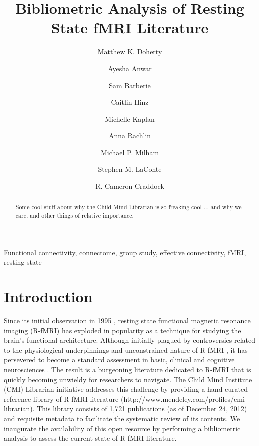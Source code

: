 \documentclass[12pt,3p,review,number]{elsarticle}
\begin{document}
\title{Bibliometric Analysis of Resting State fMRI Literature}

\author[cmi]{Matthew K. Doherty}
\author[cmi]{Ayesha Anwar}
\author[cmi]{Sam Barberie}
\author[cmi]{Caitlin Hinz}
\author[cmi]{Michelle Kaplan}
\author[cmi]{Anna Rachlin}
\author[cmi,nki]{Michael P. Milham}
\author[vtcri,vtbme]{Stephen M. LaConte}
\author[cmi,nki]{R. Cameron Craddock}


\address[cmi]{Child Mind Institute, New York, New York}
\address[nki]{Nathan Kline Institute for Psychiatric Research, Orangeburg, New York}
\address[vtcri]{Virginia Tech Carilion Research Institute, Roanoke, Virginia}
\address[vtbme]{School of Biomedical Engineering and Sciences, Virginia Tech,
Blacksburg, Virginia}

\begin{abstract}
    Some cool stuff about why the Child Mind Librarian is so freaking cool ...
    and why we care, and other things of relative importance.
\end{abstract}

\begin{keyword}
    Functional connectivity, connectome, group study, effective
    connectivity, fMRI, resting-state
\end{keyword}

\maketitle


\sloppy %

\section{Introduction}

Since its initial observation in 1995 \cite{Biswal1995}, resting state
functional magnetic resonance imaging (R-fMRI) has exploded in popularity as a
technique for studying the brain’s functional architecture. Although initially
plagued by controversies related to the physiological underpinnings and
unconstrained nature of R-fMRI \cite{Lund2001,Morcom2007}, it has persevered to
become a standard assessment in basic, clinical and cognitive neurosciences
\cite{Fox2010,Kelly2012}.  The result is a burgeoning literature dedicated to
R-fMRI that is quickly becoming unwieldy for researchers to navigate. The Child
Mind Institute (CMI) Librarian initiative addresses this challenge by providing
a hand-curated reference library of R-fMRI literature
(http://www.mendeley.com/profiles/cmi-librarian). This library consists of 1,721
publications (as of December 24, 2012) and requisite metadata to facilitate the
systematic review of its contents. We inaugurate the availability of this open
resource by performing a bibliometric analysis to assess the current state of
R-fMRI literature.
\end{document}
